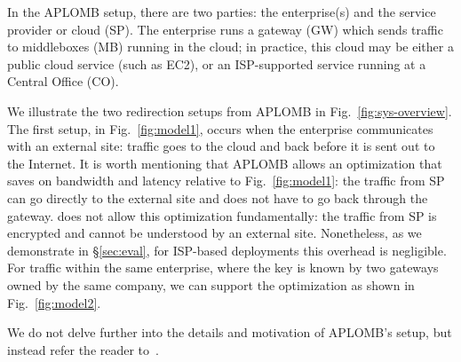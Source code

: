In the APLOMB setup, there are two parties: the enterprise(s) and the service provider or cloud (SP).
The enterprise runs a gateway (GW) which sends traffic to middleboxes (MB) running in the cloud; in practice, this cloud may be either a public cloud service (such as EC2), or an ISP-supported service running at a Central Office (CO).

We illustrate the two redirection setups from APLOMB in Fig.~\ref{fig:sys-overview}.  The first setup, in Fig.~\ref{fig:model1},  occurs when the enterprise communicates with an external site: traffic goes to the cloud and back before it is sent out to the Internet. 
It is worth mentioning that APLOMB allows an optimization that saves on bandwidth and latency relative to Fig.~\ref{fig:model1}: the traffic from SP can go directly to the external site and does not have to go back through the gateway. \sys does not allow this optimization fundamentally: the traffic from SP is encrypted and cannot be understood by an external site. 
Nonetheless, as we demonstrate in \S\ref{sec:eval}, for ISP-based deployments this overhead is negligible.
For traffic within the same enterprise, where the key is known by two gateways owned by the same company, we can support the optimization as shown in Fig.~\ref{fig:model2}.

We do not delve further into the details and motivation of APLOMB's setup, but instead refer the reader to~\cite{aplomb}. 

%
%
%
%
%
%


